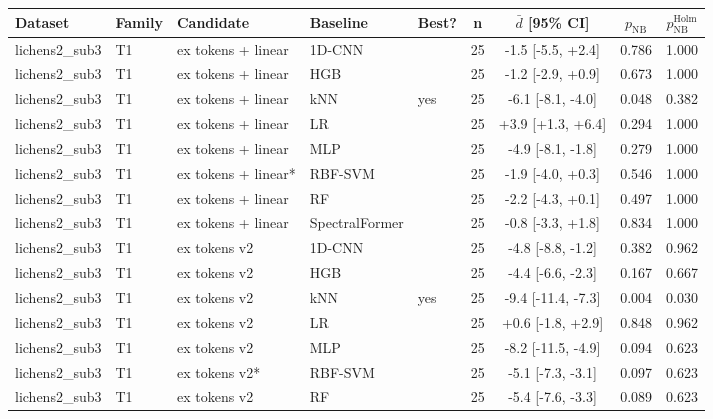 \small
\begin{tabular}{lllllcccc}
\toprule
Dataset & Family & Candidate & Baseline & Best? & n & $\bar d$ [95\% CI] & $p_{\mathrm{NB}}$ & $p_{\mathrm{NB}}^{\mathrm{Holm}}$ \\
\midrule
lichens2_sub3 & T1 & ex tokens + linear & 1D-CNN &  & 25 & -1.5 [-5.5, +2.4] & 0.786 & 1.000 \\
lichens2_sub3 & T1 & ex tokens + linear & HGB &  & 25 & -1.2 [-2.9, +0.9] & 0.673 & 1.000 \\
lichens2_sub3 & T1 & ex tokens + linear & kNN & yes & 25 & -6.1 [-8.1, -4.0] & 0.048 & 0.382 \\
lichens2_sub3 & T1 & ex tokens + linear & LR &  & 25 & +3.9 [+1.3, +6.4] & 0.294 & 1.000 \\
lichens2_sub3 & T1 & ex tokens + linear & MLP &  & 25 & -4.9 [-8.1, -1.8] & 0.279 & 1.000 \\
lichens2_sub3 & T1 & ex tokens + linear* & RBF-SVM &  & 25 & -1.9 [-4.0, +0.3] & 0.546 & 1.000 \\
lichens2_sub3 & T1 & ex tokens + linear & RF &  & 25 & -2.2 [-4.3, +0.1] & 0.497 & 1.000 \\
lichens2_sub3 & T1 & ex tokens + linear & SpectralFormer &  & 25 & -0.8 [-3.3, +1.8] & 0.834 & 1.000 \\
lichens2_sub3 & T1 & ex tokens v2 & 1D-CNN &  & 25 & -4.8 [-8.8, -1.2] & 0.382 & 0.962 \\
lichens2_sub3 & T1 & ex tokens v2 & HGB &  & 25 & -4.4 [-6.6, -2.3] & 0.167 & 0.667 \\
lichens2_sub3 & T1 & ex tokens v2 & kNN & yes & 25 & -9.4 [-11.4, -7.3] & 0.004 & 0.030 \\
lichens2_sub3 & T1 & ex tokens v2 & LR &  & 25 & +0.6 [-1.8, +2.9] & 0.848 & 0.962 \\
lichens2_sub3 & T1 & ex tokens v2 & MLP &  & 25 & -8.2 [-11.5, -4.9] & 0.094 & 0.623 \\
lichens2_sub3 & T1 & ex tokens v2* & RBF-SVM &  & 25 & -5.1 [-7.3, -3.1] & 0.097 & 0.623 \\
lichens2_sub3 & T1 & ex tokens v2 & RF &  & 25 & -5.4 [-7.6, -3.3] & 0.089 & 0.623 \\

\end{tabular}
